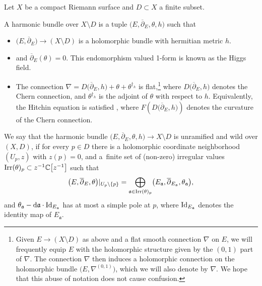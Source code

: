 Let $X$ be a compact Riemann surface and $D\subset X$ a finite subset.
\begin{Definition} A harmonic bundle over $X\setminus D$ is a tuple $\bigl(E,\overline{\partial}_E,\theta,h\bigr)$ such that
\begin{itemize}\itemsep=0pt
 \item $\bigl(E,\overline{\partial}_E\bigr)\to (X\setminus D)$ is a holomorphic bundle with hermitian metric $h$.
 \item {} and $\overline{\partial}_E(\theta)=0$. This endomorphism valued 1-form is known as the Higgs field.
 \item The connection $\nabla = D\bigl(\overline{\partial}_E,h\bigr)+\theta + \theta^{\dagger_h}$ is flat,\footnote{Given $E\to (X\setminus D)$ as above and a flat smooth connection $\nabla$ on $E$, we will frequently equip $E$ with the holomorphic structure given by the $(0,1)$ part of $\nabla$. The connection $\nabla$ then induces a holomorphic connection on the holomorphic bundle $\bigl(E,\nabla^{(0,1)}\bigr)$, which we will also denote by $\nabla$. We hope that this abuse of notation does not cause confusion.} where $D\bigl(\overline{\partial}_E,h\bigr)$ denotes the Chern connection, and $\theta^{\dagger_h}$ is the adjoint of $\theta$ with respect to $h$. Equivalently, the Hitchin equation is satisfied
,
 where $F(D\bigl(\overline{\partial}_E,h\bigr))$ denotes the curvature of the Chern connection.
\end{itemize}

We say that the harmonic bundle $\bigl(E,\overline{\partial}_E,\theta,h\bigr) \to X\setminus D$ is unramified and wild over $(X,D)$,
 if for every $p\in D$ there is a holomorphic coordinate neighborhood $(U_p,z)$ with $z(p)=0$, and a~finite set of (non-zero) irregular values $\textnormal{Irr}(\theta)_p\subset z^{-1}\mathbb{C}\bigl[z^{-1}\bigr]$ such that
 \begin{equation*}
 \bigl(E,\overline{\partial}_E,\theta\bigr)|_{U_p\setminus \{p\}}=\bigoplus_{\mathfrak{a}\in \textnormal{Irr}(\theta)_p}\bigl(E_{\mathfrak{a}},\overline{\partial}_{E_{\mathfrak{a}}},\theta_{\mathfrak{a}}\bigr),
\end{equation*}
and $\theta_{\mathfrak{a}}-{\rm d}\mathfrak{a}\cdot \textnormal{Id}_{E_{\mathfrak{a}}}$ has at most a simple pole at $p$, where $\textnormal{Id}_{E_{\mathfrak{a}}}$ denotes the identity map of $E_{\mathfrak{a}}$.
\end{Definition}

